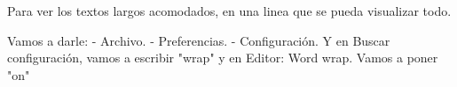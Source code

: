 Para ver los textos largos acomodados, en una linea que se pueda visualizar todo.

Vamos a darle:
- Archivo.
- Preferencias.
- Configuración.
Y en Buscar configuración, vamos a escribir "wrap" y en Editor: Word wrap. Vamos a poner "on"